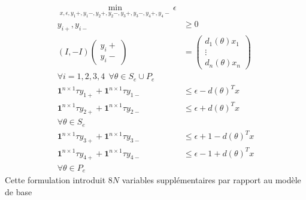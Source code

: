 \begin{align*}
\min_{x,\epsilon ,y_1+,y_1-,y_2+,y_2-,y_3+,y_3-,y_4+,y_4-} \epsilon &  \\
y_{i+},y_{i-}  & \geq  0 \\
(I,-I)
 \begin{pmatrix}
y_i+ \\
y_i-
\end{pmatrix}
& = 
\begin{pmatrix}
d_1(\theta)x_1 \\
\vdots \\
d_n(\theta)x_n 
\end{pmatrix} \\
\forall i = 1,2,3,4\:\:
\forall \theta \in S_e \cup P_e  &  \\
\mathbf{1}^{n\times 1}\tau y_{1+}+\mathbf{1}^{n\times 1}\tau y_{1-} & \leq \epsilon -d(\theta)^Tx \\
\mathbf{1}^{n\times 1}\tau y_{2+}+\mathbf{1}^{n\times 1}\tau y_{2-} & \leq \epsilon + d(\theta)^Tx \\
\forall \theta \in S_e &  \\
\mathbf{1}^{n\times 1}\tau y_{3+}+\mathbf{1}^{n\times 1}\tau y_{3-} & \leq  \epsilon +1 -d(\theta)^Tx \\
\mathbf{1}^{n\times 1}\tau y_{4+}+\mathbf{1}^{n\times 1}\tau y_{4-} & \leq  \epsilon -1 + d(\theta)^Tx \\
\forall \theta \in P_e & 
\end{align*}
Cette formulation introduit $8N$ variables supplémentaires par rapport au modèle de base
\FloatBarrier
